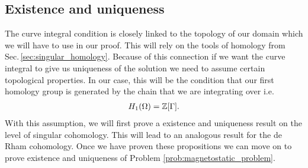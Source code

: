 \documentclass[../master_thesis.tex]{subfiles}
\begin{document}
\subsection{Existence and uniqueness}

The curve integral condition is closely linked to the topology of our domain 
which we will have to use in our proof.
This will rely on the tools of homology from Sec.\,\ref{sec:singular_homology}. 
Because of this connection if we want the curve integral
to give us uniqueness of the solution we need to assume certain topological 
properties. In our case, this will be the condition that our first 
homology group is generated by the chain that we are integrating over i.e.
\begin{align*}
    H_1(\Omega) = \mathbb{Z} [\Gamma].
\end{align*}
With this assumption, we will first prove a existence and uniqueness result on the 
level of singular cohomology. This will lead to an analogous result for the de Rham 
cohomology. Once we have proven these propositions we can move on to prove existence 
and uniqueness of Problem \ref{prob:magnetostatic_problem}.
\end{document}
